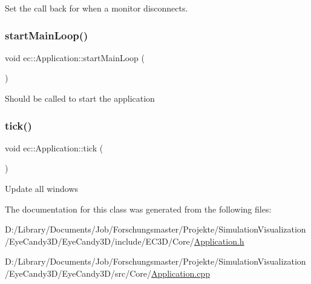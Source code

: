 Set the call back for when a monitor disconnects. \mbox{\label{classec_1_1_application_ad541044a8fc0ff8d6c3fc57220109a50}} 
\subsubsection{\texorpdfstring{start\+Main\+Loop()}{startMainLoop()}}
{\footnotesize\ttfamily void ec\+::\+Application\+::start\+Main\+Loop (\begin{DoxyParamCaption}{ }\end{DoxyParamCaption})\hspace{0.3cm}{\ttfamily [virtual]}}

Should be called to start the application \mbox{\label{classec_1_1_application_a036ae53bcbf708c7a01deb199feeccdf}} 
\subsubsection{\texorpdfstring{tick()}{tick()}}
{\footnotesize\ttfamily void ec\+::\+Application\+::tick (\begin{DoxyParamCaption}{ }\end{DoxyParamCaption})\hspace{0.3cm}{\ttfamily [virtual]}}

Update all windows 

The documentation for this class was generated from the following files\+:\begin{DoxyCompactItemize}
\item 
D\+:/\+Library/\+Documents/\+Job/\+Forschungsmaster/\+Projekte/\+Simulation\+Visualization/\+Eye\+Candy3\+D/\+Eye\+Candy3\+D/include/\+E\+C3\+D/\+Core/\mbox{\hyperlink{_application_8h}{Application.\+h}}\item 
D\+:/\+Library/\+Documents/\+Job/\+Forschungsmaster/\+Projekte/\+Simulation\+Visualization/\+Eye\+Candy3\+D/\+Eye\+Candy3\+D/src/\+Core/\mbox{\hyperlink{_application_8cpp}{Application.\+cpp}}\end{DoxyCompactItemize}
